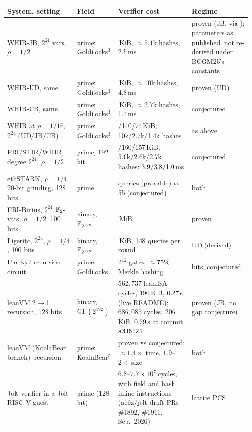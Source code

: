 \begin{table}[t]
\centering\footnotesize
\begin{tabularx}{\linewidth}{@{}>{\raggedright\arraybackslash}p{4.2cm}>{\raggedright\arraybackslash}p{1.55cm}>{\raggedright\arraybackslash}X>{\raggedright\arraybackslash}p{2.0cm}@{}}
\toprule
System, setting & Field & Verifier cost & Regime \\
\midrule
WHIR-JB, $2^{24}$ vars, $\rho=1/2$ & prime: Goldilocks$^3$ & 299\,KiB, $\approx5.1$k hashes, 2.5\,ms \cite[Tab.~5]{ACFY24-WHIR} & proven (JB, via \cite{BCGM25-MCA}); parameters as published, not re-derived under BCGM25's constants \\
WHIR-UD, same & prime: Goldilocks$^3$ & 621\,KiB, $\approx10$k hashes, 4.8\,ms & proven (UD) \\
WHIR-CB, same & prime: Goldilocks$^3$ & 156\,KiB, $\approx2.7$k hashes, 1.4\,ms & conjectured \\
WHIR at $\rho=1/16$, $2^{24}$ (UD/JB/CB) & prime: Goldilocks$^3$ & 535/140/74\,KiB; 10k/2.7k/1.4k hashes & as above \\
FRI/STIR/WHIR, degree $2^{24}$, $\rho=1/2$ & prime, 192-bit & 306/160/157\,KiB; 5.6k/2.6k/2.7k hashes; 3.9/3.8/1.0\,ms \cite[Tab.~3]{ACFY24-WHIR} & conjectured \\
ethSTARK, $\rho=1/4$, 20-bit grinding, 128 bits & prime & 140 queries (provable) vs 55 (conjectured) \cite{ethSTARK21} & both \\
FRI-Binius, $2^{24}$ $\mathbb{F}_2$-vars, $\rho=1/2$, 100 bits & binary, $\mathbb{F}_{2^{128}}$ & 0.202\,MiB \cite{DP24-FRIBinius} & proven \\
Ligerito, $2^{24}$, $\rho=1/4$, 100 bits & binary, $\mathbb{F}_{2^{128}}$ & 255\,KiB, 148 queries per round \cite{NA25-Ligerito} & UD (derived) \\
\midrule
Plonky2 recursion circuit & prime: Goldilocks & $2^{12}$ gates, $\approx75\%$ Merkle hashing \cite{Plonky2} & 100 bits, conjectured \\
leanVM 2$\to$1 recursion, 128 bits & binary, $\mathrm{GF}(2^{192})$ & $562{,}737$ leanISA cycles, 190\,KiB, 0.27\,s (live README); $686{,}085$ cycles, 206\,KiB, 0.39\,s at commit \texttt{a386121} \cite{leanVM} & proven (JB, no gap conjecture) \\
leanVM (KoalaBear branch), recursion & prime: KoalaBear$^5$ & proven vs conjectured: $\approx1.4\times$ time, $1.9$--$2\times$ size \cite{leanVM} & both \\
Jolt verifier in a Jolt RISC-V guest & prime (128-bit) & $6.8$--$7.7\times10^{7}$ cycles, with field and hash inline instructions (a16z/jolt draft PRs \#1892, \#1911, Sep.~2026) & lattice PCS \\

\end{tabularx}
\end{table}

